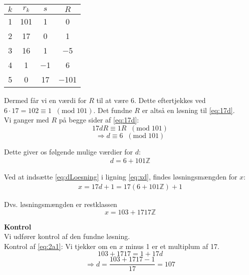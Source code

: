 \begin{table}[H]
    \centering
    \begin{tabular}{c|c|c|c}
    $k$ & $r_k$ & $s$  & $R$  \\ \hline
    1& 101   & 1  & 0  \\
    2& 17   & 0 & 1  \\
    3& 16   & 1  & $-$5 \\
    4& 1    & $-$1 & 6 \\
    5 & 0   & 17 & $-$101
    \end{tabular}
\end{table}

Dermed får vi en værdi for $R$ til at være 6. Dette eftertjekkes ved $6\cdot17 = 102 \equiv 1 \; \; (\text{mod} \; 101)$. Det fundne $R$ er altså en løsning til \eqref{eq:17d}.\\

Vi ganger med $R$ på begge sider af \eqref{eq:17d}:
\begin{equation}
17 dR \equiv 1R \; \; (\text{mod} \; 101)
\end{equation}
\begin{equation}
\Rightarrow d \equiv 6  \; \; (\text{mod} \; 101)
\end{equation}

Dette giver os følgende mulige værdier for $d$: 
\begin{gather}\label{eq:dLoesning}
    d = 6 + 101\mathds{Z}
\end{gather}

Ved at indsætte \eqref{eq:dLoesning} i ligning \eqref{eq:xd}, findes løsningsmængden for $x$:
\begin{gather*}
    x = 17d + 1 = 17(6 + 101\mathds{Z}) + 1
\end{gather*}

Dvs. løsningsmængden er restklassen
\begin{equation}
x = 103 + 1717\mathds{Z}
\end{equation}

\textbf{Kontrol}\\
Vi udfører kontrol af den fundne løsning.\\
Kontrol af \eqref{eq:2a1}: Vi tjekker om en $x$ minus 1 er et multiplum af 17. 
\begin{equation}
103 + 1717 = 1 + 17d
\end{equation}
\begin{equation}
\Rightarrow d = \frac{103+1717-1}{17} = 107
\end{equation}

